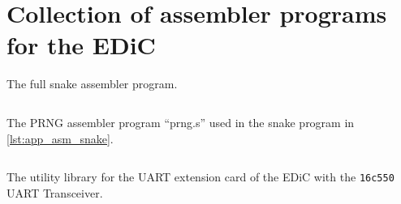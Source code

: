 \chapter{Collection of assembler programs for the \gls{EDiC}}
\begin{multipagecode}
  \caption{The full snake assembler program.}
  \begin{multicols}{2}
    \inputminted[linenos,
      breaklines,
      frame=leftline,
      xleftmargin=20pt,
    ]{ARM}{src/snake.s}
  \end{multicols}
  \label{lst:app_asm_snake}
\end{multipagecode}

\begin{multipagecode}
  \caption{The \gls{PRNG} assembler program ``prng.s'' used in the snake program in \cref{lst:app_asm_snake}.}
  \inputminted[linenos,
    breaklines,
    frame=leftline,
    xleftmargin=20pt,
  ]{ARM}{src/prng.s}
  \label{lst:app_asm_prng}
\end{multipagecode}

\begin{multipagecode}
  \caption{The utility library for the \gls{UART} extension card of the \gls{EDiC} with the \texttt{16c550} \gls{UART} Transceiver.}
  \begin{multicols}{2}
    \inputminted[linenos,
      breaklines,
      frame=leftline,
      xleftmargin=20pt,
    ]{ARM}{src/uart_16c550.s}
  \end{multicols}
  \label{lst:app_asm_uart}
\end{multipagecode}
